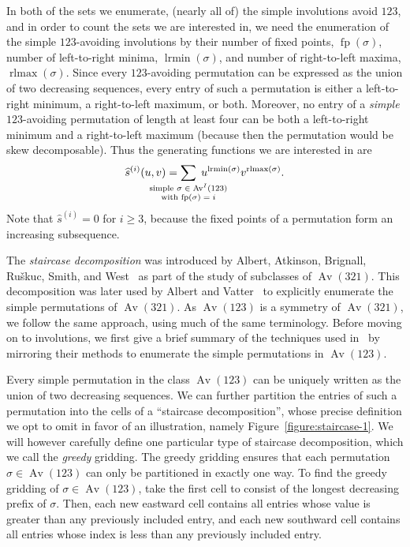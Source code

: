 \documentclass[10pt]{article}
\theoremstyle{plain}
\newcommand{\Av}{\operatorname{Av}}
\newcommand{\fp}{\operatorname{fp}}
\newcommand{\lrmin}{\operatorname{lrmin}}
\newcommand{\rlmax}{\operatorname{rlmax}}
\begin{document}
In both of the sets we enumerate, (nearly all of) the simple involutions avoid $123$, and in order to count the sets we are interested in, we need the enumeration of the simple $123$-avoiding involutions by their number of fixed points, $\fp(\sigma)$, number of left-to-right minima, $\lrmin(\sigma)$, and number of right-to-left maxima, $\rlmax(\sigma)$. Since every $123$-avoiding permutation can be expressed as the union of two decreasing sequences, every entry of such a permutation is either a left-to-right minimum, a right-to-left maximum, or both. Moreover, no entry of a \emph{simple} $123$-avoiding permutation of length at least four can be both a left-to-right minimum and a right-to-left maximum (because then the permutation would be skew decomposable). Thus the generating functions we are interested in are
	\[
	\widehat{s}^{(i)}(u,v)
	=
	\sum_{\mathclap{\substack{\textrm{simple $\sigma\in\Av^I(123)$}\\ \text{with $\fp(\sigma)=i$}}}} \; u^{\lrmin(\sigma)} v^{\rlmax(\sigma)}.
	\]
Note that $\widehat{s}^{(i)}=0$ for $i\ge 3$, because the fixed points of a permutation form an increasing subsequence.

The \emph{staircase decomposition} was introduced by Albert, Atkinson, Brignall, Ru\v{s}kuc, Smith, and West~\cite{albert:growth-rates-fo:} as part of the study of subclasses of $\Av(321)$. This decomposition was later used by Albert and Vatter~\cite{albert:generating-and-:} to explicitly enumerate the simple permutations of $\Av(321)$. As $\Av(123)$ is a symmetry of $\Av(321)$, we follow the same approach, using much of the same terminology. Before moving on to involutions, we first give a brief summary of the techniques used in~\cite{albert:generating-and-:} by mirroring their methods to enumerate the simple permutations in $\Av(123)$. 

Every simple permutation in the class $\Av(123)$ can be uniquely written as the union of two decreasing sequences. We can further partition the entries of such a permutation into the cells of a ``staircase decomposition'', whose precise definition we opt to omit in favor of an illustration, namely Figure~\ref{figure:staircase-1}.
We will however carefully define one particular type of staircase decomposition, which we call the \emph{greedy} gridding. The greedy gridding ensures that each permutation $\sigma \in \Av(123)$ can only be partitioned in exactly one way.
To find the greedy gridding of $\sigma \in \Av(123)$, take the first cell to consist of the longest decreasing prefix of $\sigma$. Then, each new eastward cell contains all entries whose value is greater than any previously included entry, and each new southward cell contains all entries whose index is less than any previously included entry.
\end{document}
